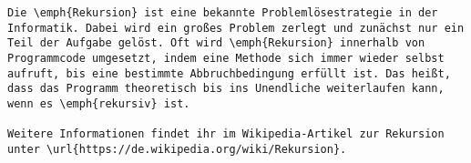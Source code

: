 \begin{verbatim}
Die \emph{Rekursion} ist eine bekannte Problemlösestrategie in der Informatik. Dabei wird ein großes Problem zerlegt und zunächst nur ein Teil der Aufgabe gelöst. Oft wird \emph{Rekursion} innerhalb von Programmcode umgesetzt, indem eine Methode sich immer wieder selbst aufruft, bis eine bestimmte Abbruchbedingung erfüllt ist. Das heißt, dass das Programm theoretisch bis ins Unendliche weiterlaufen kann, wenn es \emph{rekursiv} ist.
	
Weitere Informationen findet ihr im Wikipedia-Artikel zur Rekursion unter \url{https://de.wikipedia.org/wiki/Rekursion}.
\end{verbatim}
